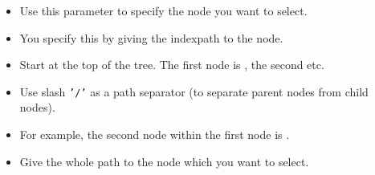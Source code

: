\begin{itemize}
\item Use this parameter to specify the node you want to select.
\item You specify this by giving the indexpath to the node.
\item Start at the top of the tree. The first node is , the second  etc.
\item Use slash {\tt '/'} as a path separator (to separate parent nodes from child nodes).
\item For example, the second node within the first node is . 
\item Give the whole path to the node which you want to select.
\end{itemize}

